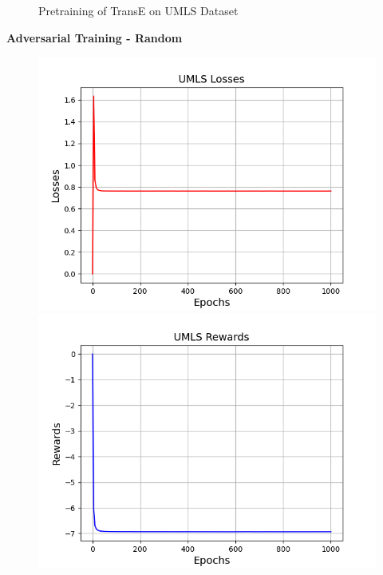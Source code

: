 \begin{figure}
\begin{minipage}{.3\textwidth}
    \end{minipage}%
    \caption{Pretraining of TransE on UMLS Dataset}
    \label{fig:test}
\end{figure}


\textbf{Adversarial Training - Random}\\
\begin{figure}
    \centering
    \begin{minipage}{.5\textwidth}
      \centering
      \includegraphics[width=0.9\linewidth]{figures/results/UMLS/AdversarialTraining/Random/gan_train_umls_losses.png}
    \end{minipage}%
    \begin{minipage}{.5\textwidth}
      \centering
      \includegraphics[width=0.9\linewidth]{figures/results/UMLS/AdversarialTraining/Random/gan_train_umls_rewards.png}
    \end{minipage}

\end{figure}
